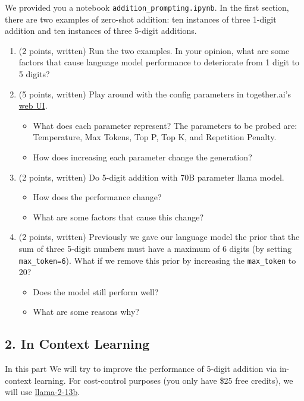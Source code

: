 \documentclass{article}
\theoremstyle{case}
\theoremstyle{definition}
\begin{document}
We provided you a notebook \texttt{addition\_prompting.ipynb}. In the first section, there are two examples of zero-shot addition: ten instances of three 1-digit addition and ten instances of three 5-digit additions.
\begin{enumerate}[label=\alph*.]
    \item (2 points, written) Run the two examples. In your opinion, what are some factors that cause language model performance to deteriorate from 1 digit to 5 digits?
    \newpage
    \item (5 points, written) Play around with the config parameters in together.ai's \href{https://api.together.xyz/playground/chat/meta-llama/Llama-2-13b-chat-hf}{web UI}.
    \begin{itemize}
        \item What does each parameter represent? The parameters to be probed are: Temperature, Max Tokens, Top P, Top K, and Repetition Penalty.
        \item How does increasing each parameter change the generation?
    \end{itemize}
    \newpage
    \item (2 points, written) Do 5-digit addition with 70B parameter llama model.
    \begin{itemize}
        \item How does the performance change?
        \item What are some factors that cause this change?
    \end{itemize}
    \newpage
    \item (2 points, written) Previously we gave our language model the prior that the sum of three 5-digit numbers must have a maximum of 6 digits (by setting \texttt{max\_token=6}). What if we remove this prior by increasing the \texttt{max\_token} to 20?
    \begin{itemize}
        \item Does the model still perform well?
        \item What are some reasons why?
    \end{itemize}
\end{enumerate}

\newpage
\subsection*{2. In Context Learning}

In this part We will try to improve the performance of 5-digit addition via in-context learning.
For cost-control purposes (you only have \$25 free credits), we will use \href{https://api.together.xyz/models/meta-llama/Llama-2-13b-chat-hfb}{llama-2-13b}.
\end{document}
